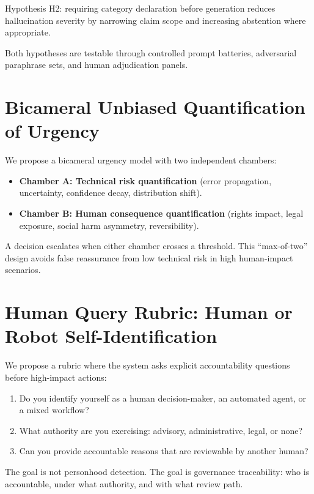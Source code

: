\documentclass[conference]{IEEEtran}
\begin{document}
Hypothesis H2: requiring category declaration before generation reduces hallucination severity by narrowing claim scope and increasing abstention where appropriate.

Both hypotheses are testable through controlled prompt batteries, adversarial paraphrase sets, and human adjudication panels.

\section{Bicameral Unbiased Quantification of Urgency}
We propose a bicameral urgency model with two independent chambers:
\begin{itemize}
    \item \textbf{Chamber A: Technical risk quantification} (error propagation, uncertainty, confidence decay, distribution shift).
    \item \textbf{Chamber B: Human consequence quantification} (rights impact, legal exposure, social harm asymmetry, reversibility).
\end{itemize}

A decision escalates when either chamber crosses a threshold. This ``max-of-two'' design avoids false reassurance from low technical risk in high human-impact scenarios.

\section{Human Query Rubric: Human or Robot Self-Identification}
We propose a rubric where the system asks explicit accountability questions before high-impact actions:
\begin{enumerate}
    \item Do you identify yourself as a human decision-maker, an automated agent, or a mixed workflow?
    \item What authority are you exercising: advisory, administrative, legal, or none?
    \item Can you provide accountable reasons that are reviewable by another human?
\end{enumerate}

The goal is not personhood detection. The goal is governance traceability: who is accountable, under what authority, and with what review path.
\end{document}
